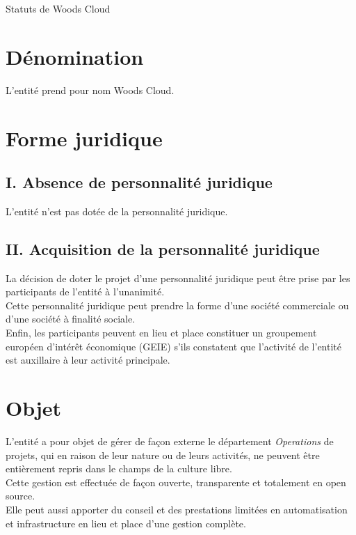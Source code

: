 \documentclass[10pt, a4paper]{article}
\begin{document}
{\LARGE Statuts de Woods Cloud}\\[1cm]

\section*{Dénomination}
L'entité prend pour nom Woods Cloud.

\section*{Forme juridique}

\subsection*{I. Absence de personnalité juridique}

L'entité n'est pas dotée de la personnalité juridique.

\subsection*{II. Acquisition de la personnalité juridique}

La décision de doter le projet d'une personnalité juridique peut être prise par les participants de l'entité à l'unanimité.\\

Cette personnalité juridique peut prendre la forme d'une société commerciale ou d'une société à finalité sociale.\\

Enfin, les participants peuvent en lieu et place constituer un groupement européen d'intérêt économique (GEIE) s'ils constatent que l'activité de l'entité est auxillaire à leur activité principale.

\section*{Objet}

L'entité a pour objet de gérer de façon externe le département \textit{Operations} de projets, qui en raison de leur nature ou de leurs activités, ne peuvent être entièrement repris dans le champs de la culture libre.\\

Cette gestion est effectuée de façon ouverte, transparente et totalement en open source.\\

Elle peut aussi apporter du conseil et des prestations limitées en automatisation et infrastructure en lieu et place d'une gestion complète.
\end{document}
